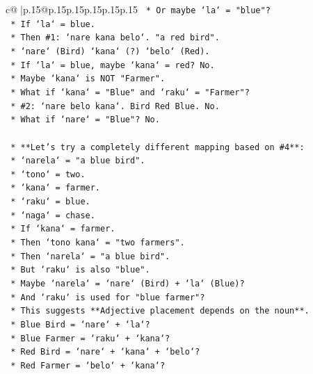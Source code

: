 \documentclass{article}
\begin{document}
{\begin{supertabular}{c@{$\;$}|p{.15\linewidth}@{}p{.15\linewidth}p{.15\linewidth}p{.15\linewidth}p{.15\linewidth}p{.15\linewidth}}
{{{\texttt{                *   Or maybe `la` = "blue"?} \\
\texttt{                *   If `la` = blue.} \\
\texttt{                *   Then \#1: `nare kana belo`. "a red bird".} \\
\texttt{                    *   `nare` (Bird) `kana` (?) `belo` (Red).} \\
\texttt{                    *   If `la` = blue, maybe `kana` = red? No.} \\
\texttt{                *   Maybe `kana` is NOT "Farmer".} \\
\texttt{                *   What if `kana` = "Blue" and `raku` = "Farmer"?} \\
\texttt{                    *   \#2: `nare belo kana`. Bird Red Blue. No.} \\
\texttt{                *   What if `nare` = "Blue"? No.} \\
\\ 
\texttt{    *   **Let's try a completely different mapping based on \#4**:} \\
\texttt{        *   `narela` = "a blue bird".} \\
\texttt{        *   `tono` = two.} \\
\texttt{        *   `kana` = farmer.} \\
\texttt{        *   `raku` = blue.} \\
\texttt{        *   `naga` = chase.} \\
\texttt{        *   If `kana` = farmer.} \\
\texttt{        *   Then `tono kana` = "two farmers".} \\
\texttt{        *   Then `narela` = "a blue bird".} \\
\texttt{        *   But `raku` is also "blue".} \\
\texttt{        *   Maybe `narela` = `nare` (Bird) + `la` (Blue)?} \\
\texttt{        *   And `raku` is used for "blue farmer"?} \\
\texttt{        *   This suggests **Adjective placement depends on the noun**.} \\
\texttt{        *   Blue Bird = `nare` + `la`?} \\
\texttt{        *   Blue Farmer = `raku` + `kana`?} \\
\texttt{        *   Red Bird = `nare` + `kana` + `belo`?} \\
\texttt{        *   Red Farmer = `belo` + `kana`?} \\
}}}
\end{supertabular}}
\end{document}
